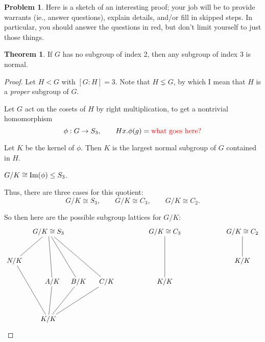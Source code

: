 \documentclass[12pt]{article}
\theoremstyle{definition} %
\newtheorem{problem}{Problem}
\newtheorem*{theorem}{Theorem}
\begin{document}
\begin{problem}
  Here is a sketch of an interesting proof; your job will be to provide warrants (ie., answer  questions), explain details, and/or fill in skipped steps. In particular, you should answer the questions in red, but don't limit yourself to just those things.

  \begin{theorem}
  If $G$ has no subgroup of index 2, then any subgroup of index 3 is normal.
  \end{theorem}
  \begin{proof}
    Let $H < G$ with $[G:H] = 3$. Note that $H \lneq G$, by which I mean that $H$ is a \textit{proper} subgroup of $G$. 
    
    Let $G$ act on the cosets of $H$ by right multiplication, to get a nontrivial homomorphism 
    \[\phi:G \to S_3, \qquad Hx.\phi(g) = \Alert{\text{what goes here?}}\]
    
    Let $K$ be the kernel of $\phi$. Then $K$ is the largest normal subgroup of $G$ contained in $H$. 

    $G/K \cong \operatorname{Im}(\phi) \leq S_3$. 

    Thus, there are three cases for this quotient: 
    \[G/K \cong S_3, \qquad G/K \cong C_3, \qquad G/K \cong C_2.\] 

    So then here are the possible subgroup lattices for $G/K$:
    \[
    \begin{tikzpicture}[shorten >= -2pt,shorten <= -2pt]
      \begin{scope}[shift={(0,0)},scale=1]
        \node(G) at (0,6) {$G/K \cong S_3$};
        \node(N) at (-1.75,4.5) {$N/K$};
        \node(K) at (0,1.5) {$K/K$};
        \node(H1) at (.2,24/7) {$A/K$};
        \node(H2) at (1.55,24/7) {$B/K$};
        \node(H3) at (3,24/7) {$C/K$};
        \draw(N)--(K);
        \draw(G)--(H1); 
        \draw(G)--(H2);
        \draw(G)--(H3);
        \draw(G)--(N) ;
        \draw(K)--(H1);
        \draw(K)--(H2);
        \draw(K)--(H3);
      \end{scope}
      \begin{scope}[shift={(6,0)},scale=1]
        \node(G) at (0,6) {$G/K \cong C_3$};
        \node(K) at (0,24/7) {$K/K$};
        \draw(G)--(K);
      \end{scope}
      \begin{scope}[shift={(10,0)},scale=1]
        \node(G) at (0,6) {$G/K \cong C_2$};
        \node(K) at (0,4.5) {$K/K$};
        \draw(G)--(K);
      \end{scope}
    \end{tikzpicture}
    \]


\end{proof}
\end{problem}
\end{document}
